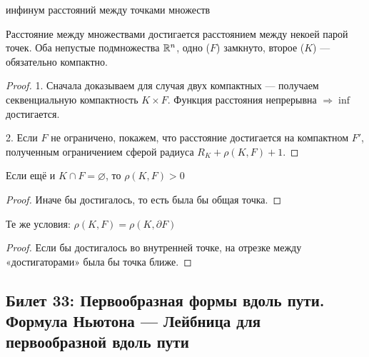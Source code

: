\documentclass[12pt, a4paper, oneside]{memoir}
\begin{document}
\begin{definition} 
    инфинум расстояний между точками множеств
\end{definition}

\begin{theorem} 
    Расстояние между множествами достигается расстоянием между некоей парой точек.
    Оба непустые подмножества ${\mathbb{R}}^n$, одно ($F$) замкнуто, второе ($K$) — обязательно компактно.

    \begin{proof}
        1. Сначала доказываем для случая двух компактных — получаем секвенциальную компактность $K × F$.
        Функция расстояния непрерывна $\Rightarrow \inf$ достигается.
        
        2. Если $F$ не ограничено, покажем, что расстояние достигается на компактном $F'$, 
        полученным ограничением сферой радиуса $R_K + \rho(K, F) + 1$.
    \end{proof}
\end{theorem}

\begin{corollary}\label{dist_g0}
    Если ещё и $K \cap F = \varnothing$, то $\rho(K, F) > 0$

    \begin{proof}
        Иначе бы достигалось, то есть была бы общая точка.
    \end{proof}
\end{corollary}

\begin{corollary}
    Те же условия: $\rho(K, F) = \rho(K, \partial F)$

    \begin{proof}
        Если бы достигалось во внутренней точке, 
        на отрезке между «достигаторами» была бы точка ближе.
    \end{proof}
\end{corollary}


\subsection{Билет 33: Первообразная формы вдоль пути. Формула Ньютона — Лейбница для первообразной вдоль пути}
\end{document}
